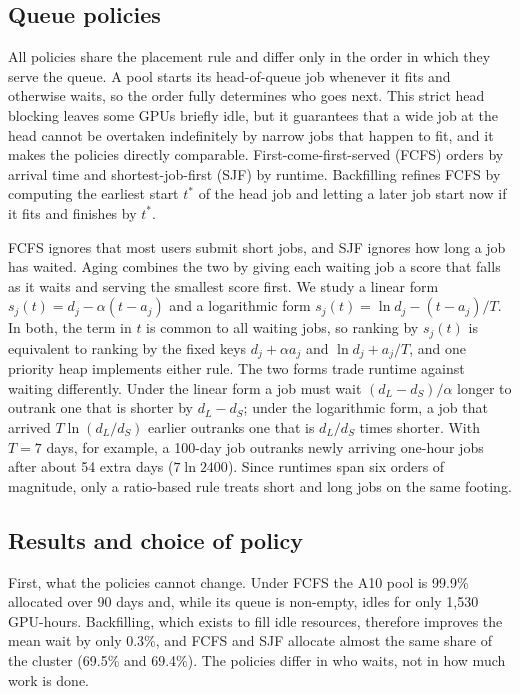 \documentclass[11pt,a4paper]{article}
\begin{document}
\subsection{Queue policies}

All policies share the placement rule and differ only in the order in which they serve the queue. A pool starts its head-of-queue job whenever it fits and otherwise waits, so the order fully determines who goes next. This strict head blocking leaves some GPUs briefly idle, but it guarantees that a wide job at the head cannot be overtaken indefinitely by narrow jobs that happen to fit, and it makes the policies directly comparable. First-come-first-served (FCFS) orders by arrival time and shortest-job-first (SJF) by runtime. Backfilling refines FCFS by computing the earliest start $t^*$ of the head job and letting a later job start now if it fits and finishes by $t^*$.

FCFS ignores that most users submit short jobs, and SJF ignores how long a job has waited. Aging combines the two by giving each waiting job a score that falls as it waits and serving the smallest score first. We study a linear form $s_j(t)=d_j-\alpha(t-a_j)$ and a logarithmic form $s_j(t)=\ln d_j-(t-a_j)/T$. In both, the term in $t$ is common to all waiting jobs, so ranking by $s_j(t)$ is equivalent to ranking by the fixed keys $d_j+\alpha a_j$ and $\ln d_j+a_j/T$, and one priority heap implements either rule. The two forms trade runtime against waiting differently. Under the linear form a job must wait $(d_L-d_S)/\alpha$ longer to outrank one that is shorter by $d_L-d_S$; under the logarithmic form, a job that arrived $T\ln(d_L/d_S)$ earlier outranks one that is $d_L/d_S$ times shorter. With $T=7$ days, for example, a 100-day job outranks newly arriving one-hour jobs after about 54 extra days ($7\ln 2400$). Since runtimes span six orders of magnitude, only a ratio-based rule treats short and long jobs on the same footing.

\subsection{Results and choice of policy}

First, what the policies cannot change. Under FCFS the A10 pool is 99.9\% allocated over 90 days and, while its queue is non-empty, idles for only 1,530 GPU-hours. Backfilling, which exists to fill idle resources, therefore improves the mean wait by only 0.3\%, and FCFS and SJF allocate almost the same share of the cluster (69.5\% and 69.4\%). The policies differ in who waits, not in how much work is done.
\end{document}
